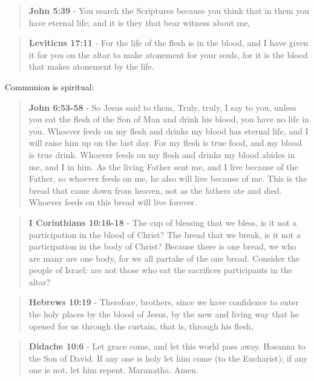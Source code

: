 \documentclass[11pt]{article}
\begin{document}
\begin{quote}
\textbf{John 5:39} - You search the Scriptures because you think that in them you have eternal life; and it is they that bear witness about me,
\end{quote}

\begin{quote}
\textbf{Leviticus 17:11} - For the life of the flesh is in the blood, and I have given it for you on the altar to make atonement for your souls, for it is the blood that makes atonement by the life.
\end{quote}

Communion is spiritual:

\begin{quote}
\textbf{John 6:53-58} - So Jesus said to them, Truly, truly, I say to you, unless you eat the flesh of the Son of Man and drink his blood, you have no life in you.  Whoever feeds on my flesh and drinks my blood has eternal life, and I will raise him up on the last day.  For my flesh is true food, and my blood is true drink.  Whoever feeds on my flesh and drinks my blood abides in me, and I in him.  As the living Father sent me, and I live because of the Father, so whoever feeds on me, he also will live because of me.  This is the bread that came down from heaven, not as the fathers ate and died. Whoever feeds on this bread will live forever.
\end{quote}

\begin{quote}
\textbf{I Corinthians 10:16-18} - The cup of blessing that we bless, is it not a participation in the blood of Christ? The bread that we break, is it not a participation in the body of Christ? Because there is one bread, we who are many are one body, for we all partake of the one bread. Consider the people of Israel: are not those who eat the sacrifices participants in the altar?
\end{quote}

\begin{quote}
\textbf{Hebrews 10:19} - Therefore, brothers, since we have confidence to enter the holy places by the blood of Jesus, by the new and living way that he opened for us through the curtain, that is, through his flesh,
\end{quote}

\begin{quote}
\textbf{Didache 10:6} - Let grace come, and let this world pass away. Hosanna to the Son of David. If any one is holy let him come (to the Eucharist); if any one is not, let him repent. Maranatha. Amen.
\end{quote}
\end{document}
